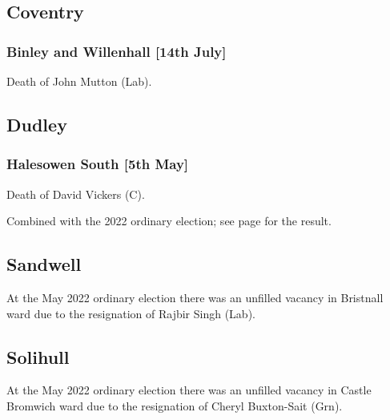 \documentclass[a4paper,openany]{book}
\begin{document}
\begin{resultsiii}
\subsection*{Coventry}

\subsubsection*{Binley and Willenhall \hspace*{\fill}\nolinebreak[1]%
	\enspace\hspace*{\fill}
	[14th July]}


Death of John Mutton (Lab).

\subsection*{Dudley}

\subsubsection*{Halesowen South \hspace*{\fill}\nolinebreak[1]%
	\enspace\hspace*{\fill}
	[5th May]}


Death of David Vickers (C).

Combined with the 2022 ordinary election; see page \pageref{DudleyHalesowenSouth} for the result.

\subsection*{Sandwell}

At the May 2022 ordinary election there was an unfilled vacancy in Bristnall ward due to the resignation of Rajbir Singh (Lab).%

\subsection*{Solihull}

At the May 2022 ordinary election there was an unfilled vacancy in Castle Bromwich ward due to the resignation of Cheryl Buxton-Sait (Grn).%


\end{resultsiii}
\end{document}

